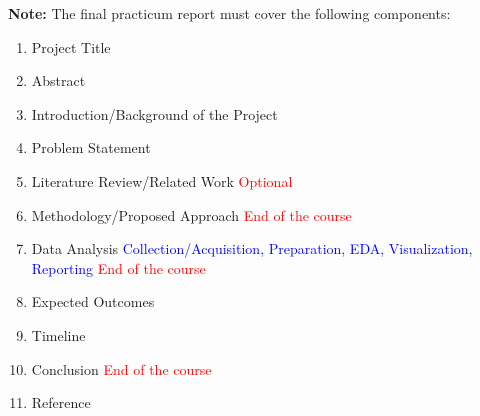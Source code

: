 \documentclass[12pt, onecolumn]{IEEEtran}
\begin{document}
\noindent \textbf{Note:} The final practicum report must cover the following components:
\begin{enumerate}
  \item Project Title 
  \item Abstract
  \item Introduction/Background of the Project
  \item Problem Statement
  \item Literature Review/Related Work \textcolor{red}{Optional}
  \item Methodology/Proposed Approach \textcolor{red}{End of the course}
  \item Data Analysis \textcolor{blue}{Collection/Acquisition, Preparation, EDA, Visualization, Reporting} \textcolor{red}{End of the course}
  \item Expected Outcomes
  \item Timeline
  \item Conclusion \textcolor{red}{End of the course}
  \item Reference
\end{enumerate}





\end{document}
